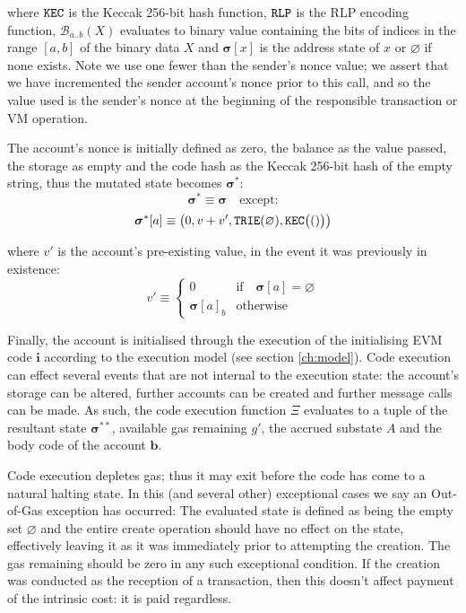 \documentclass[9pt,oneside]{amsart}
\begin{document}
\begin{multicols}{2}
where $\mathtt{\tiny KEC}$ is the Keccak 256-bit hash function, $\mathtt{\tiny RLP}$ is the RLP encoding function, $\mathcal{B}_{a..b}(X)$ evaluates to binary value containing the bits of indices in the range $[a, b]$ of the binary data $X$ and $\boldsymbol{\sigma}[x]$ is the address state of $x$ or $\varnothing$ if none exists. Note we use one fewer than the sender's nonce value; we assert that we have incremented the sender account's nonce prior to this call, and so the value used is the sender's nonce at the beginning of the responsible transaction or VM operation.

The account's nonce is initially defined as zero, the balance as the value passed, the storage as empty and the code hash as the Keccak 256-bit hash of the empty string, thus the mutated state becomes $\boldsymbol{\sigma}^*$:
\begin{equation}
\boldsymbol{\sigma}^* \equiv \boldsymbol{\sigma} \quad \text{except:}
\end{equation}
\begin{equation}
\boldsymbol{\sigma}^*[a] \equiv \big( 0, v + v', \mathtt{\tiny TRIE}(\varnothing), \mathtt{\tiny KEC}\big(()\big) \big)
\end{equation}

where $v'$ is the account's pre-existing value, in the event it was previously in existence:
\begin{equation}
v' \equiv \begin{cases}
0 & \text{if} \quad \boldsymbol{\sigma}[a] = \varnothing\\
\boldsymbol{\sigma}[a]_b & \text{otherwise}
\end{cases}
\end{equation}


Finally, the account is initialised through the execution of the initialising EVM code $\mathbf{i}$ according to the execution model (see section \ref{ch:model}). Code execution can effect several events that are not internal to the execution state: the account's storage can be altered, further accounts can be created and further message calls can be made. As such, the code execution function $\Xi$ evaluates to a tuple of the resultant state $\boldsymbol{\sigma}^{**}$, available gas remaining $g'$, the accrued substate $A$ and the body code of the account $\mathbf{b}$.

Code execution depletes gas; thus it may exit before the code has come to a natural halting state. In this (and several other) exceptional cases we say an Out-of-Gas exception has occurred: The evaluated state is defined as being the empty set $\varnothing$ and the entire create operation should have no effect on the state, effectively leaving it as it was immediately prior to attempting the creation. The gas remaining should be zero in any such exceptional condition. If the creation was conducted as the reception of a transaction, then this doesn't affect payment of the intrinsic cost: it is paid regardless.


\end{multicols}
\end{document}
